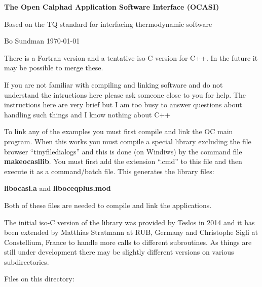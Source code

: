 \documentclass[12pt]{article}
\begin{document}
\begin{center} 

{\Large \bf The Open Calphad Application Software Interface (OCASI)

Based on the TQ standard for interfacing thermodynamic software}

\bigskip

Bo Sundman \today

\end{center}

There is a Fortran version and a tentative iso-C version for C++.  
In the future it may be possible to merge these.

If you are not familiar with compiling and linking software and do not
understand the intructions here please ask someone close to you for
help.  The instructions here are very brief but I am too busy to
answer questions about handling such things and I know nothing about
C++

To link any of the examples you must first compile and link the OC
main program.  When this works you must compile a special library
excluding the file browser ``tinyfiledialogs'' and this is done (on
Windiws) by the command file {\bf makeocasilib}.  You must first add
the extension ``.cmd'' to this file and then execute it as a
command/batch file.  This generates the library files:

{\bf libocasi.a} and {\bf liboceqplus.mod}

Both of these files are needed to compile and link the applications.

The initial iso-C version of the library was provided by Teslos in
2014 and it has been extended by Matthias Stratmann at RUB, Germany
and Christophe Sigli at Constellium, France to handle more calls to
different subroutines.  As things are still under development there
may be slightly different versions on various subdirectories.

Files on this directory:
\end{document}

